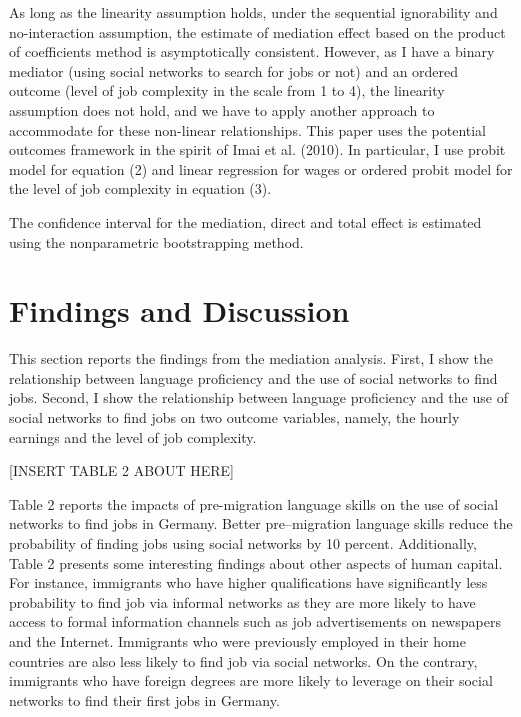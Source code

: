 \documentclass[12pt,a4paper]{article}
\begin{document}
As long as the linearity assumption holds, under the sequential ignorability and no-interaction assumption, the estimate of mediation effect based on the product of coefficients method is asymptotically consistent. However, as I have a binary mediator (using social networks to search for jobs or not) and an ordered outcome (level of job complexity in the scale from 1 to 4), the linearity assumption does not hold, and we have to apply another approach to accommodate for these non-linear relationships. This paper uses the potential outcomes framework in the spirit of Imai et al. (2010). In particular, I use probit model for equation (2) and linear regression for wages or ordered probit model for the level of job complexity in equation (3).

The confidence interval for the mediation, direct and total effect is estimated using the nonparametric bootstrapping method.

\section{Findings and Discussion}
This section reports the findings from the mediation analysis. First, I show the relationship between language proficiency and the use of social networks to find jobs. Second, I show the relationship between language proficiency and the use of social networks to find jobs on two outcome variables, namely, the hourly earnings and the level of job complexity.

\begin{center}
[INSERT TABLE 2 ABOUT HERE]
\end{center}

Table 2 reports the impacts of pre-migration language skills on the use of social networks to find jobs in Germany. Better pre--migration language skills reduce the probability of finding jobs using social networks by 10 percent. Additionally, Table 2 presents some interesting findings about other aspects of human capital. For instance, immigrants who have higher qualifications have significantly less probability to find job via informal networks as they are more likely to have access to formal information channels such as job advertisements on newspapers and the Internet. Immigrants who were previously employed in their home countries are also less likely to find job via social networks. On the contrary, immigrants who have foreign degrees are more likely to leverage on their social networks to find their first jobs in Germany.
\end{document}
